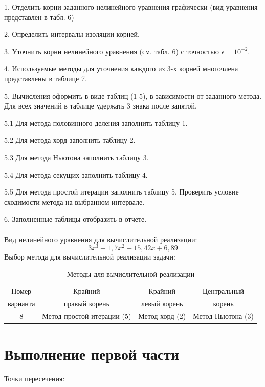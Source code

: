 \documentclass{article}
\begin{document}
1. Отделить корни заданного нелинейного уравнения графически (вид уравнения представлен в табл. 6)

2. Определить интервалы изоляции корней.

3. Уточнить корни нелинейного уравнения (см. табл. 6) с точностью $\epsilon=10^{-2}$.

4. Используемые методы для уточнения каждого из 3-х корней многочлена
представлены в таблице 7.

5. Вычисления оформить в виде таблиц (1-5), в зависимости от заданного метода. Для всех значений в таблице удержать 3 знака после запятой.

5.1 Для метода половинного деления заполнить таблицу 1.

5.2 Для метода хорд заполнить таблицу 2.

5.3 Для метода Ньютона заполнить таблицу 3.

5.4 Для метода секущих заполнить таблицу 4.

5.5 Для метода простой итерации заполнить таблицу 5. Проверить условие сходимости метода на выбранном интервале.

6. Заполненные таблицы отобразить в отчете.
\\ \\
Вид нелинейного уравнения для вычислительной реализации:
\[
    3x^3+1,7x^2-15,42x+6,89\]
Выбор метода для вычислительной реализации задачи:
\begin{table}[h]
    \centering
    \begin{tabular}{|*{4}{c|}}
        \hline
        Номер & Крайний & Крайний & Центральный  \\
        варианта & правый корень & левый корень & корень \\
        \hline
        8 & Метод простой итерации (5) & Метод хорд (2) & Метод Ньютона (3) \\
        \hline
    \end{tabular}
    \caption{Методы для вычислительной реализации}
\end{table}

\section{Выполнение первой части}
Точки пересечения:
\end{document}
